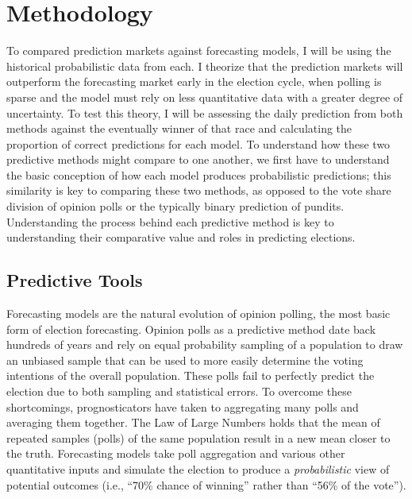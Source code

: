 \documentclass[11pt,]{article}
\begin{document}
\hypertarget{methodology}{%
\section{Methodology}\label{methodology}}

To compared prediction markets against forecasting models, I will be
using the historical probabilistic data from each. I theorize that the
prediction markets will outperform the forecasting market early in the
election cycle, when polling is sparse and the model must rely on less
quantitative data with a greater degree of uncertainty. To test this
theory, I will be assessing the daily prediction from both methods
against the eventually winner of that race and calculating the
proportion of correct predictions for each model. To understand how
these two predictive methods might compare to one another, we first have
to understand the basic conception of how each model produces
probabilistic predictions; this similarity is key to comparing these two
methods, as opposed to the vote share division of opinion polls or the
typically binary prediction of pundits. Understanding the process behind
each predictive method is key to understanding their comparative value
and roles in predicting elections.

\hypertarget{predictive-tools}{%
\subsection{Predictive Tools}\label{predictive-tools}}

Forecasting models are the natural evolution of opinion polling, the
most basic form of election forecasting. Opinion polls as a predictive
method date back hundreds of years and rely on equal probability
sampling of a population to draw an unbiased sample that can be used to
more easily determine the voting intentions of the overall population.
These polls fail to perfectly predict the election due to both sampling
and statistical errors. To overcome these shortcomings, prognosticators
have taken to aggregating many polls and averaging them together. The
Law of Large Numbers holds that the mean of repeated samples (polls) of
the same population result in a new mean closer to the truth.
Forecasting models take poll aggregation and various other quantitative
inputs and simulate the election to produce a \emph{probabilistic} view
of potential outcomes (i.e., ``70\% chance of winning'' rather than
``56\% of the vote'').
\end{document}

